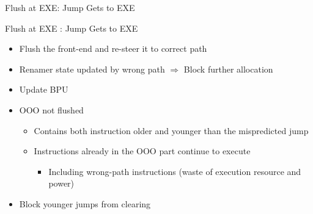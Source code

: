 \documentclass[aspectratio=169,12pt]{beamer}
\begin{document}
\begin{frame}{Flush at EXE: Jump Gets to EXE}
    \centering
    
    \vspace{4cm} %
\end{frame}

\begin{frame}{Flush at EXE : Jump Gets to EXE}
    \vspace{1cm}
    \centering
    
    
    \vspace{0.5cm}
    \begin{itemize}
        \item Flush the front-end and re-steer it to correct path
        \item Renamer state updated by wrong path $\Rightarrow$ Block further allocation
        \item Update BPU
        \item OOO not flushed
        \begin{itemize}
            \item Contains both instruction older and younger than the mispredicted jump
            \item Instructions already in the OOO part continue to execute
            \begin{itemize}
                \item Including wrong-path instructions (waste of execution resource and power)
            \end{itemize}
        \end{itemize}
        \item Block younger jumps from clearing
    \end{itemize}
\end{frame}
\end{document}
